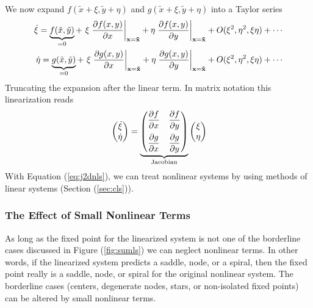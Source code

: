 We now expand $f(\tilde{x}+\xi, \tilde{y}+\eta)$ and $g(\tilde{x}+\xi, \tilde{y}+\eta)$ into a Taylor series
\begin{equation}
	\begin{aligned}
		\dot{\xi}=\underbrace{f(\tilde{x},\tilde{y})}_{=0}+\ \xi\at{\frac{\partial f(x,y)}{\partial x}}{\mathbf{x=\tilde{x}}}+\eta\at{\frac{\partial f(x,y)}{\partial y}}{\mathbf{x=\tilde{x}}}+O(\xi^2,\eta^2,\xi\eta)+\cdots\\
		\dot{\eta}=\underbrace{g(\tilde{x},\tilde{y})}_{=0}+\ \xi\at{\frac{\partial g(x,y)}{\partial x}}{\mathbf{x=\tilde{x}}}+\eta\at{\frac{\partial g(x,y)}{\partial y}}{\mathbf{x=\tilde{x}}}+O(\xi^2,\eta^2,\xi\eta)+\cdots
	\end{aligned}
\end{equation}
Truncating the expansion after the linear term.
In matrix notation this linearization reads
\begin{equation}{\label{eq:j2dnls}}
	\begin{pmatrix}
		\dot{\xi}\\\dot{\eta}
	\end{pmatrix}=
	\underbrace{
	\begin{pmatrix}
		\dfrac{\partial f}{\partial x}&\dfrac{\partial f}{\partial y}\\[10pt]
		\dfrac{\partial g}{\partial x}&\dfrac{\partial g}{\partial y}
	\end{pmatrix}
	}_{\text{Jacobian}}
	\begin{pmatrix}
		\xi\\\eta
	\end{pmatrix}
\end{equation}
With Equation (\ref{eq:j2dnls}), we can treat nonlinear systems by using methods of linear systems (Section (\ref{sec:cls})).
\subsubsection{The Effect of Small Nonlinear Terms}{\label{sec:eosnt}}
As long as the fixed point for the linearized system is not one of the borderline cases discussed in Figure (\ref{fig:sumls}) we can neglect nonlinear terms.
In other words, if the linearized system predicts a saddle, node, or a spiral, then the fixed point really is a saddle, node, or spiral for the original nonlinear system.
The borderline cases (centers, degenerate nodes, stars, or non-isolated fixed
points) can be altered by small nonlinear terms.
